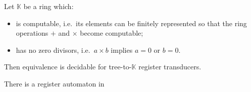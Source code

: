\begin{theorem}
    Let $\mathbb K$ be a ring which:
    \begin{itemize}
        \item is computable, i.e.~its elements can be finitely represented so that the ring operations $+$ and $\times$ become computable;
        \item has no zero divisors, i.e.~$a \times b$ implies $a = 0$ or $b=0$.
    \end{itemize}
    Then equivalence is decidable for tree-to-$\mathbb K$ register transducers.
\end{theorem}

\begin{lemma}
    There is a register automaton in 
\end{lemma}